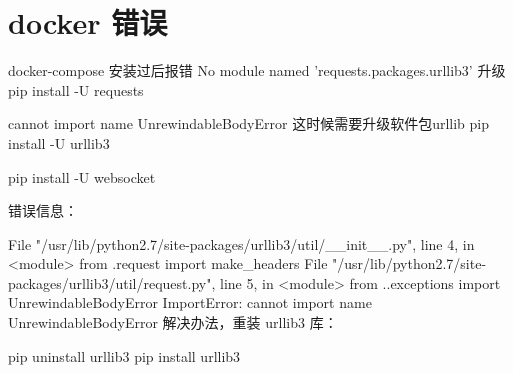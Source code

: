 \section{docker 错误}
docker-compose 安装过后报错
 No module named 'requests.packages.urllib3'
升级 pip install -U requests

cannot import name UnrewindableBodyError
这时候需要升级软件包urllib
pip install -U urllib3

pip install -U websocket


错误信息：

File "/usr/lib/python2.7/site-packages/urllib3/util/__init__.py", line 4, in <module>
    from .request import make_headers
  File "/usr/lib/python2.7/site-packages/urllib3/util/request.py", line 5, in <module>
    from ..exceptions import UnrewindableBodyError
ImportError: cannot import name UnrewindableBodyError
解决办法，重装 urllib3 库：

pip uninstall urllib3
pip install urllib3
